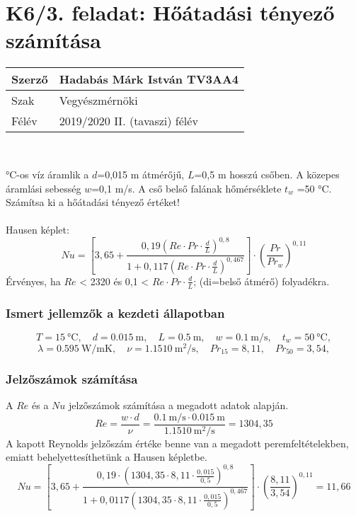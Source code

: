\section*{K6/3. feladat: Hőátadási tényező számítása}
	\begin{tabular}{ | p{2cm} | p{14cm} | } 
		\hline
		Szerző & Hadabás Márk István TV3AA4 \\ 
		\hline
		Szak & Vegyészmérnöki \\ 
		\hline
		Félév & 2019/2020 II. (tavaszi) félév \\ 
		\hline
	\end{tabular} \\
	\vspace{0.5cm} 
		
	 °C-os víz áramlik a $d$=0,015 m átmérőjű, $L$=0,5 m hosszú csőben. A közepes áramlási sebesség $w$=0,1 m/s. A cső belső falának hőmérséklete $t_w$ =50 °C. Számítsa ki a hőátadási tényező értéket!
	\\ \\
	Hausen képlet:
		\[ Nu = \left[ 3,65 + \frac{0,19 \left( Re \cdot Pr \cdot \frac{d}{L} \right)^{0,8} }{1 + 0,117 \left( Re \cdot Pr \cdot \frac{d}{L} \right)^{0,467} } \right] \cdot \left( \frac{Pr}{Pr_w} \right)^{0,11}  \]
	Érvényes, ha $Re$ < 2320 és 0,1 < $Re \cdot Pr \cdot \frac{d}{L}$; (di=belső átmérő) folyadékra.
	\\ 
	\subsubsection{Ismert jellemzők a kezdeti állapotban}
		\begin{equation*}	
			T= \SI{15}{\celsius}, 
			\quad
			d= \SI{0,015}{\meter},
			\quad
			L= \SI{0,5}{\meter},
			\quad
			w= \SI{0,1}{\meter\per\second},
			\quad
			t_w= \SI{50}{\celsius},			
		\end{equation*}
		\begin{equation*}
			\lambda= \SI{0,595}{\watt\per\meter\kelvin},
			\quad
			\nu = \SI{1,15 10}{\meter\squared\per\second },
			\quad
			Pr_{15}= 8,11,
			\quad
			Pr_{50}= 3,54,			
		\end{equation*}
		\noindent\hrulefill
	\subsubsection{Jelzőszámok számítása}
	A $Re$ és a $Nu$ jelzőszámok számítása a megadott adatok alapján. 
		\begin{equation}
			Re = \frac{w \cdot d}{\nu} = \frac{\SI{0,1}{\meter\per\second} \cdot \SI{0,015}{\meter}}{\SI{1,15 10}{\meter\squared\per\second }}=1304,35
		\end{equation}
          A kapott Reynolds jelzőszám értéke benne van a megadott peremfeltételekben, emiatt behelyettesíthetünk a Hausen képletbe.
		\begin{equation}
			Nu = \left[ 3,65 + \frac{ 0,19 \cdot \left( 1304,35 \cdot 8,11 \cdot\frac{0,015}{0,5}\right)^{0,8}}{1 + 0,0117 \left( 1304,35 \cdot 8,11 \cdot \frac{0,015}{0,5}\right)^{0,467}}\right] \cdot \left( \frac{8,11}{3,54}\right)^{0,11}  = 11,66
		\end{equation}
